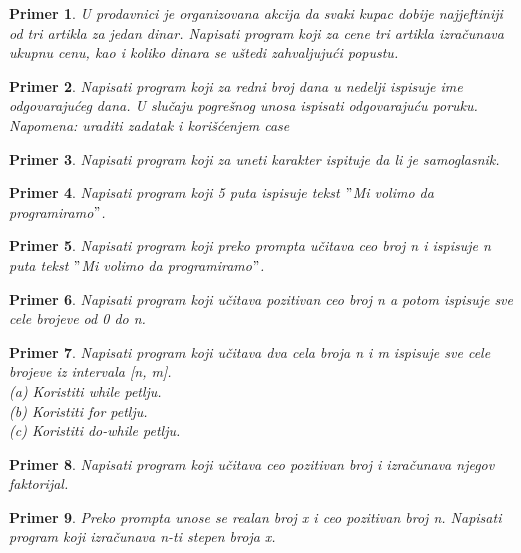 \documentclass[a4paper]{article}
\newtheorem{primer}{Primer}[section]
\begin{document}
\begin{primer}
U prodavnici je organizovana akcija da svaki kupac dobije
najjeftiniji od tri artikla za jedan dinar. Napisati program koji za cene
tri artikla izračunava ukupnu cenu, kao i koliko dinara se uštedi zahvaljujući
popustu.
\end{primer}


\begin{primer}
Napisati program koji za redni broj dana u nedelji ispisuje
ime odgovarajućeg dana. U slučaju pogrešnog unosa ispisati odgovarajuću
poruku. Napomena: uraditi zadatak i korišćenjem case
\end{primer}

\begin{primer}
Napisati program koji za uneti karakter ispituje da li je
samoglasnik.
\end{primer}

\begin{primer}
Napisati program koji 5 puta ispisuje tekst $"$Mi volimo da
programiramo$"$.
\end{primer}

\begin{primer}
Napisati program koji preko prompta učitava ceo broj n i ispisuje n puta
tekst $"$Mi volimo da
programiramo$"$.
\end{primer}

\begin{primer}
Napisati program koji učitava pozitivan ceo broj n a potom
ispisuje sve cele brojeve od 0 do n.
\end{primer}

\begin{primer}
Napisati program koji učitava dva cela broja n i m ispisuje
sve cele brojeve iz intervala [n, m].\\
(a) Koristiti while petlju.\\
(b) Koristiti for petlju.\\
(c) Koristiti do-while petlju.\\
\end{primer}

\begin{primer}
Napisati program koji učitava ceo pozitivan broj i izračunava
njegov faktorijal. 
\end{primer}

\begin{primer}
Preko prompta unose se realan broj x i ceo pozitivan
broj n. Napisati program koji izračunava n-ti stepen broja x.
\end{primer}
\end{document}
